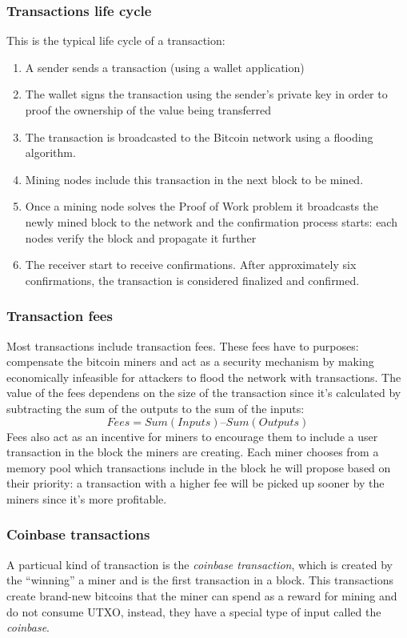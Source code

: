 \subsubsection{Transactions life cycle}
This is the typical life cycle of a transaction:
\begin{enumerate}
  \item A sender sends a transaction (using a wallet application)
  \item The wallet signs the transaction using the sender's private key in order
  to proof the ownership of the value being transferred
  \item The transaction is broadcasted to the Bitcoin network using a flooding algorithm.
  \item Mining nodes include this transaction in the next block to be mined.
  \item Once a mining node solves the Proof of Work problem it broadcasts the
  newly mined block to the network and the confirmation process starts: each
  nodes verify the block and propagate it further
  \item The receiver start to receive confirmations. After approximately six
  confirmations, the transaction is considered finalized and confirmed.
\end{enumerate}




\subsubsection{Transaction fees} Most transactions include transaction fees.
These fees have to purposes: compensate the bitcoin miners and act as a security
mechanism by making economically infeasible for attackers to flood the network
with transactions. The value of the fees dependens on the size of the
transaction since it's calculated by subtracting the sum of the outputs to the
sum of the inputs: \[Fees = Sum(Inputs) – Sum(Outputs)\] Fees also  act as an
incentive for miners to encourage them to include a user transaction in the
block the miners are creating. Each miner chooses from a memory pool which
transactions include in the block he will propose based on their priority:  a
transaction with a higher fee will be picked up sooner by the miners since it's
more profitable.


\subsubsection{Coinbase transactions} A particual kind of transaction is the
\emph{coinbase transaction}, which is created by the ``winning'' a miner and is
the first transaction in a block. This transactions create brand-new bitcoins
that the miner can spend as a reward for mining and do not consume UTXO,
instead, they have a special type of input called the \emph{coinbase}.














